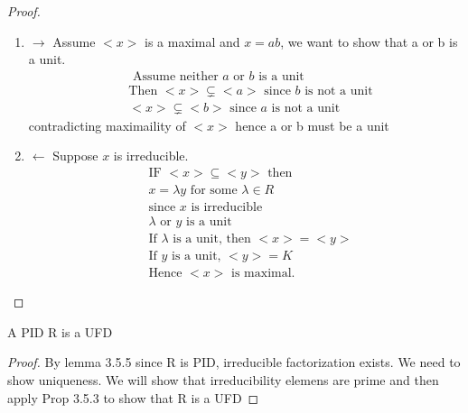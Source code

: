 \documentclass{article}
\begin{document}
    \begin{proof}
        \begin{enumerate}
            \item $ \rightarrow$ Assume $<x>$ is a maximal and $x = ab$, we want to show that a or b is a unit. \begin{align*}
                &\text{ Assume neither } a \text{ or } b \text{ is a unit } \\ 
                &\text{Then } <x> \subsetneq <a> \text{ since } b \text{ is not a unit} \\ 
                &<x> \subsetneq <b> \text{ since } a \text{ is not a unit}
            \end{align*}
            contradicting maximaility of $<x>$ hence a or b must be a unit 
            \item $\leftarrow$ Suppose $x$ is irreducible. \begin{align*}
                &\text{IF } <x> \subseteq <y> \text{ then } \\ 
                &x = \lambda y  \text { for some } \lambda \in R \\ 
                &\text{since } x \text{ is irreducible } \\ 
                &\lambda \text{ or } y \text{ is a unit} \\ 
                &\text{If } \lambda \text{ is a unit, then } <x> = <y> \\ 
                &\text{If } y \text{ is a unit, } <y> = K \\ 
                &\text{Hence  } <x> \text{ is maximal. }
            \end{align*}
        \end{enumerate}


    \end{proof}

    \begin{theorem}[3.5.7]
        A PID R is a UFD 
        
    \end{theorem}
    \begin{proof}
        By lemma 3.5.5 since R is  PID, irreducible factorization exists. We need to show uniqueness. We will show that irreducibility elemens are prime and then apply Prop 3.5.3 to show that R is a UFD 
        
    \end{proof}
\end{document}
